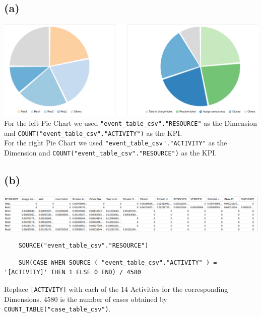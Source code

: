 \documentclass[../../main.tex]{subfiles}
\begin{document}
\subsection*{(a)}
\includegraphics[width=\columnwidth]{img/Celonis_a_Visualization.png}\\
For the left Pie Chart we used \verb|"event_table_csv"."RESOURCE"| as the Dimension and \verb|COUNT("event_table_csv"."ACTIVITY")| as the KPI.\\
For the right Pie Chart we used \verb|"event_table_csv"."ACTIVITY"| as the Dimension and \verb|COUNT("event_table_csv"."RESOURCE")| as the KPI.


\subsection*{(b)}
\includegraphics[width=\columnwidth]{img/Celonis_b_OLAP.png}\\
\begin{verbatim}
	SOURCE("event_table_csv"."RESOURCE")
\end{verbatim}
\begin{lstlisting}
	SUM(CASE WHEN SOURCE ( "event_table_csv"."ACTIVITY" ) = '[ACTIVITY]' THEN 1 ELSE 0 END) / 4580
\end{lstlisting}
Replace \verb|[ACTIVITY]| with each of the 14 Activities for the corresponding Dimensions. 4580 is the number of cases obtained by \verb|COUNT_TABLE("case_table_csv")|.
\end{document}

